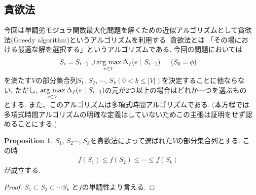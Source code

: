 \documentclass[11pt, a4paper, dvipdfmx]{jsbook}
\theoremstyle{definition}
\newtheorem{Proposition+}[Axiom+]{Proposition}
\begin{document}
\subsection{貪欲法}
 今回は単調劣モジュラ関数最大化問題を解くための近似アルゴリズムとして貪欲法(Greedy algorithm)というアルゴリズムを利用する. 貪欲法とは
「その場における最適な解を選択する」というアルゴリズムである. 今回の問題においては
\begin{align*}
    S_{i} = S_{i - 1}\cup\mathop{\rm arg~max}\limits_{e\in V}\Delta_{f}(e~|~S_{i - 1})\hspace{15pt}(S_{0} = \phi)
\end{align*}
を満たす$V$の部分集合列$S_{1}$, $S_{2}$, $\cdots$, $S_{k}(0<k\leq |V|)$を決定することに他ならない. ただし, $\mathop{\rm arg~max}\limits_{e\in V}\Delta_{f}(e~|~S_{i - 1})$の元が2つ以上の場合はどれか一つを選ぶものとする. 
また、このアルゴリズムは多項式時間アルゴリズムである. (本方程では多項式時間アルゴリズムの明確な定義はしていないためこの主張は証明をせず認めることにする.) 
\begin{Proposition+}
$S_{1}$, $S_{2}$$\cdots$, $S_{k}$を貪欲法によって選ばれた$V$の部分集合列とする. この時
    \begin{align*}
        f(S_{1})\leq f(S_{2})\leq \cdots \leq f(S_{k})
    \end{align*}
    が成立する.
    \begin{proof}
        $S_{1}\subset S_{2}\subset \cdots S_{k}$ と$f$の単調性より言える.
    \end{proof}
\end{Proposition+}
\end{document}

